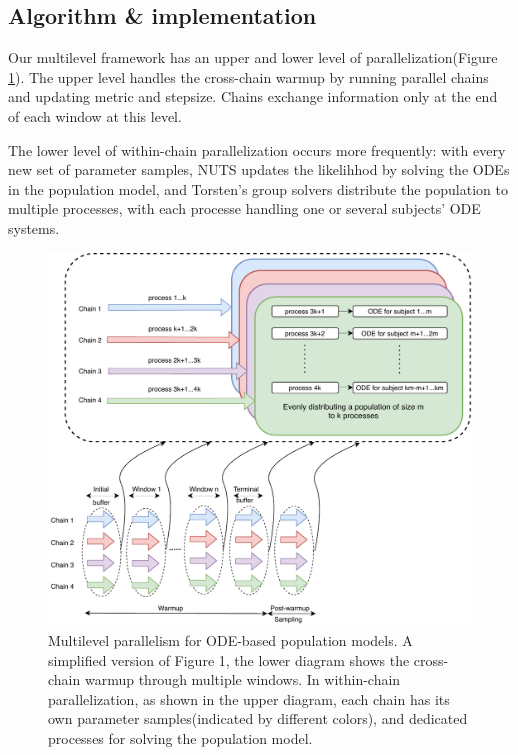 \documentclass[11pt, reqno, oneside]{amsart}
\begin{document}
\subsection{Algorithm \& implementation}
\label{sec:org73bc4d1}
Our multilevel framework has an upper and lower level of parallelization(Figure \ref{multilevel-diagram}). The upper
level handles the cross-chain warmup by running parallel chains and
updating metric and stepsize. Chains exchange
information only at the end of each window at this level. 

The lower level of within-chain parallelization occurs more
frequently: with every new set of parameter samples, NUTS updates the likelihhod
by solving the ODEs in the population model, and Torsten's group
solvers distribute the population to multiple processes, with each
processe handling one or several subjects' ODE systems.

\begin{figure}[htbp]
\centering
\includegraphics[width=\textwidth]{./figure/within_chain_parallel_diagram.pdf}
\caption{Multilevel parallelism for ODE-based population models. A simplified version of Figure 1, the lower diagram shows the cross-chain warmup through multiple windows. In within-chain parallelization, as shown in the upper diagram, each chain has its own parameter samples(indicated by different colors), and dedicated processes for solving the population model. \label{multilevel-diagram}}
\end{figure}
\end{document}
